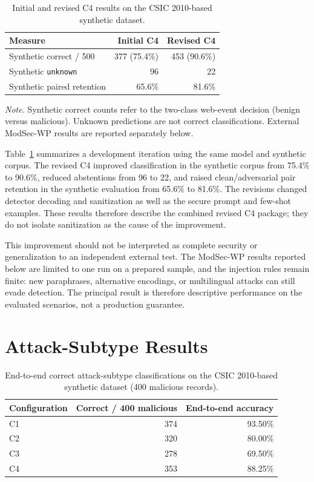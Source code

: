 \begin{table}[H]
\centering
\caption{Initial and revised C4 results on the CSIC 2010-based synthetic dataset.}
\label{tab:c4-development-comparison}
\begin{tabular}{@{}lrr@{}}
\toprule
Measure & Initial C4 & Revised C4 \\
\midrule
Synthetic correct / 500 & 377 (75.4\%) & 453 (90.6\%) \\
Synthetic \texttt{unknown} & 96 & 22 \\
Synthetic paired retention & 65.6\% & 81.6\% \\
\bottomrule
\end{tabular}
\par\smallskip
\begin{minipage}{\textwidth}\footnotesize
\textit{Note.} Synthetic correct counts refer to the two-class web-event
decision (benign versus malicious). Unknown predictions are not correct
classifications. External ModSec-WP results are reported separately
below.
\end{minipage}
\end{table}

Table~\ref{tab:c4-development-comparison} summarizes a development
iteration using the same model and synthetic corpus. The revised C4
improved classification in the synthetic corpus from 75.4\% to 90.6\%,
reduced abstentions from 96 to 22, and raised clean/adversarial pair retention in
the synthetic evaluation from 65.6\% to 81.6\%.
The revisions changed detector decoding and sanitization as well as the
secure prompt and few-shot examples. These results therefore describe the
combined revised C4 package; they do not isolate sanitization as the
cause of the improvement.

This improvement should not be interpreted as complete security or
generalization to an independent external test. The ModSec-WP results
reported below are limited to one run on a prepared sample, and the
injection rules remain finite: new paraphrases, alternative encodings,
or multilingual attacks can still evade detection. The principal result
is therefore descriptive performance on the evaluated scenarios, not a
production guarantee.

\section{Attack-Subtype Results}\label{attack-subtype-results}

\begin{table}[htbp]
\centering
\caption{End-to-end correct attack-subtype classifications on the CSIC 2010-based synthetic dataset (400 malicious records).}
\label{tab:subtype-overall}
\begin{tabular}{@{}lrr@{}}
\toprule
Configuration & Correct / 400 malicious & End-to-end accuracy \\
\midrule
C1 & 374 & 93.50\% \\
C2 & 320 & 80.00\% \\
C3 & 278 & 69.50\% \\
C4 & 353 & 88.25\% \\
\bottomrule
\end{tabular}
\end{table}

